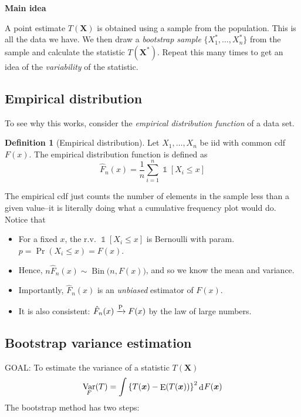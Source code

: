 \documentclass[
]{book}
\providecommand{\tightlist}{%
  \setlength{\itemsep}{0pt}\setlength{\parskip}{0pt}}
\newcommand{\bx}{{\boldsymbol x}}
\newcommand{\bX}{{\boldsymbol X}}
\DeclareMathOperator{\E}{E}
\DeclareMathOperator{\Var}{Var}
\DeclareMathOperator{\Bin}{Bin}
\DeclareMathOperator{\ind}{\mathds{1}}
\DeclareMathOperator{\dd}{d}
\newcommand{\dint}{\dd\hspace{0.5pt}\!}
\theoremstyle{definition}
\newtheorem{definition}{Definition}[chapter]
\theoremstyle{definition}
\theoremstyle{definition}
\theoremstyle{definition}
\theoremstyle{remark}
\begin{document}
\textbf{Main idea}

A point estimate \(T(\bX)\) is obtained using a sample from the population. This is all the data we have. We then draw a \emph{bootstrap sample} \(\{X_1^*,\dots,X_n^*\}\) from the sample and calculate the statistic \(T(\bX^*)\). Repeat this many times to get an idea of the \emph{variability} of the statistic.

\hypertarget{empirical-distribution}{%
\subsection{Empirical distribution}\label{empirical-distribution}}

To see why this works, consider the \emph{empirical distribution function} of a data set.

\begin{definition}[Empirical distribution]
Let \(X_1,\dots,X_n\) be iid with common cdf \(F(x)\). The empirical distribution function is defined as
\[
\hat F_n(x) = \frac{1}{n} \sum_{i=1}^n \ind[X_i\leq x]
\]
\end{definition}

The empirical cdf just counts the number of elements in the sample less than a given value--it is literally doing what a cumulative frequency plot would do. Notice that

\begin{itemize}
\tightlist
\item
  For a fixed \(x\), the r.v. \(\ind[X_i\leq x]\) is Bernoulli with param. \(p=\Pr(X_i\leq x)=F(x)\).
\item
  Hence, \(n\hat F_n(x)\sim\Bin\big(n,F(x)\big)\), and so we know the mean and variance.
\item
  Importantly, \(\hat F_n(x)\) is an \emph{unbiased} estimator of \(F(x)\).
\item
  It is also consistent: \(\hat F_n(x) \xrightarrow{\text P} F(x)\) by the law of large numbers.
\end{itemize}

\hypertarget{bootstrap-variance-estimation}{%
\subsection{Bootstrap variance estimation}\label{bootstrap-variance-estimation}}

GOAL: To estimate the variance of a statistic \(T(\bX)\)
\[
\Var_F(T)= \int \left\{T(\bx) - \E(T(\bx))\right\}^2 \dint F(\bx)
\]
The bootstrap method has two steps:
\end{document}
